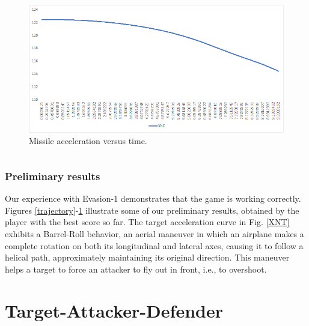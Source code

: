 \documentclass{beamer}
\begin{document}
\begin{frame}
\begin{columns}[c]
	\begin{column}{.3\linewidth}
		\begin{figure}[H]
			\centering
			\includegraphics[scale = 0.23]{fig/XNC.PNG}
			\caption{Missile acceleration versus time.}
			\label{XNC}
		\end{figure}
	\end{column}
\end{columns}
\end{frame}
\begin{frame}
\frametitle{Preliminary results}
Our experience with Evasion-1 demonstrates that the game is working correctly. Figures \ref{trajectory}-\ref{XNC} illustrate some of our preliminary results, obtained by the player with the best score so far. The target acceleration curve in Fig. \ref{XNT} exhibits a Barrel-Roll behavior, an aerial maneuver in which an airplane makes a complete rotation on both its longitudinal and lateral axes, causing it to follow a helical path, approximately maintaining its original direction. This maneuver helps a target to force an attacker to fly out in front, i.e., to overshoot. 
\end{frame}

\section{Target-Attacker-Defender}

\end{document}
